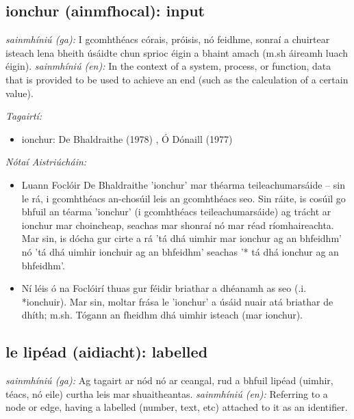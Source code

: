 \documentclass{article}
\begin{document}
\subsection*{ionchur (ainmfhocal): input} 
 \noindent \textit{sainmhíniú (ga):} I gcomhthéacs córais, próisis, nó feidhme, sonraí a chuirtear isteach lena bheith úsáidte chun sprioc éigin a bhaint amach (m.sh áireamh luach éigin).
\newline\newline
 \noindent \textit{sainmhíniú (en):} In the context of a system, process, or function, data that is provided to be used to achieve an end (such as the calculation of a certain value).
\newline

 \noindent \textit{Tagairtí:}
\begin{itemize}
	\item ionchur: De Bhaldraithe (1978) \cite{de-bhaldraithe}, Ó Dónaill (1977) \cite{odonaill}
\end{itemize}

 \noindent \textit{Nótaí Aistriúcháin:}
\begin{itemize}
	\item Luann Foclóir De Bhaldraithe 'ionchur' mar théarma teileachumarsáide -- sin le rá, i gcomhthéacs an-chosúil leis an gcomhthéacs seo. Sin ráite, is cosúil go bhfuil an téarma 'ionchur' (i gcomhthéacs teileachumarsáide) ag trácht ar ionchur mar choincheap, seachas mar shonraí nó mar réad ríomhaireachta. Mar sin, is dócha gur cirte a rá 'tá dhá uimhir mar ionchur ag an bhfeidhm' nó 'tá dhá uimhir ionchuir ag an bhfeidhm' seachas '* tá dhá ionchur ag an bhfeidhm'.
	\item Ní léis ó na Foclóirí thuas gur féidir briathar a dhéanamh as seo (.i. *ionchuir). Mar sin, moltar frása le 'ionchur' a úsáid nuair atá briathar de dhíth; m.sh. Tógann an fheidhm dhá uimhir isteach (mar ionchur).
\end{itemize}


\subsection*{le lipéad (aidiacht): labelled} 
 \noindent \textit{sainmhíniú (ga):} Ag tagairt ar nód nó ar ceangal, rud a bhfuil lipéad (uimhir, téacs, nó eile) curtha leis mar shuaitheantas.
\newline\newline
 \noindent \textit{sainmhíniú (en):} Referring to a node or edge, having a labelled (number, text, etc) attached to it as an identifier.
\newline
\end{document}
